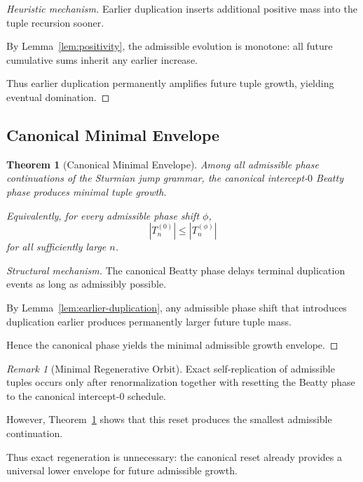 \documentclass[12pt, oneside]{article}
\numberwithin{equation}{section}
\theoremstyle{definition}
\theoremstyle{plain}
\newtheorem{theorem}{Theorem}[section]
\theoremstyle{remark}
\newtheorem*{remark}{Remark}
\begin{document}
\begin{proof}[Heuristic mechanism]
Earlier duplication inserts additional positive mass into the tuple
recursion sooner.

By Lemma~\ref{lem:positivity}, the admissible evolution is monotone:
all future cumulative sums inherit any earlier increase.

Thus earlier duplication permanently amplifies future tuple growth,
yielding eventual domination.
\end{proof}


\subsection{Canonical Minimal Envelope}


\begin{theorem}[Canonical Minimal Envelope]
\label{thm:minimal-envelope}
Among all admissible phase continuations of the Sturmian jump grammar,
the canonical intercept-$0$ Beatty phase produces minimal tuple growth.

Equivalently, for every admissible phase shift $\phi$,
\[
|T_n^{(0)}|
\le
|T_n^{(\phi)}|
\]
for all sufficiently large $n$.
\end{theorem}

\begin{proof}[Structural mechanism]
The canonical Beatty phase delays terminal duplication events
as long as admissibly possible.

By Lemma~\ref{lem:earlier-duplication}, any admissible phase shift
that introduces duplication earlier produces permanently larger
future tuple mass.

Hence the canonical phase yields the minimal admissible growth
envelope.
\end{proof}


\begin{remark}[Minimal Regenerative Orbit]
Exact self-replication of admissible tuples occurs only after
renormalization together with resetting the Beatty phase to the
canonical intercept-$0$ schedule.

However, Theorem~\ref{thm:minimal-envelope} shows that this reset
produces the smallest admissible continuation.

Thus exact regeneration is unnecessary:
the canonical reset already provides a universal lower envelope for
future admissible growth.
\end{remark}
\end{document}
